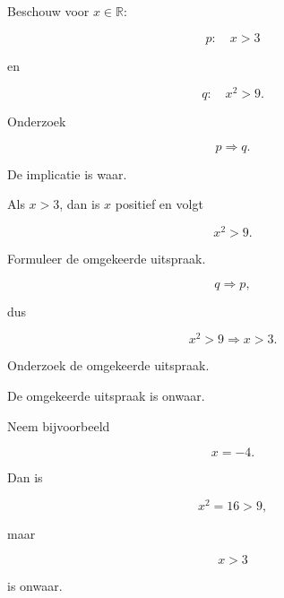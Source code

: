 \documentclass{ximera}
\begin{document}
\begin{oefening}{\oefU\ESS}

Beschouw voor $x\in\mathbb{R}$:

\[
p:\quad x>3
\]

en

\[
q:\quad x^2>9.
\]

\begin{question}

Onderzoek

\[
p\Rightarrow q.
\]

\begin{oplossing}

De implicatie is waar.

Als $x>3$, dan is $x$ positief en volgt

\[
x^2>9.
\]

\end{oplossing}

\end{question}

\begin{question}

Formuleer de omgekeerde uitspraak.

\begin{oplossing}

\[
q\Rightarrow p,
\]

dus

\[
x^2>9\Rightarrow x>3.
\]

\end{oplossing}

\end{question}

\begin{question}

Onderzoek de omgekeerde uitspraak.

\begin{oplossing}

De omgekeerde uitspraak is onwaar.

Neem bijvoorbeeld

\[
x=-4.
\]

Dan is

\[
x^2=16>9,
\]

maar

\[
x>3
\]

is onwaar.

\end{oplossing}

\end{question}

\end{oefening}
\end{document}
